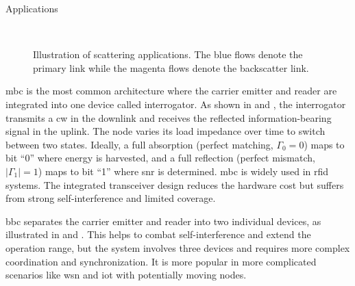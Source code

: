 \begin{section}{}
	\begin{subsection}{Applications}
		\begin{figure}[!t]
			\centering
			\\
			\caption{
				Illustration of scattering applications.
				The blue flows denote the primary link while the magenta flows denote the backscatter link.
			}
		\end{figure}

		\begin{subsubsection}{}
			\gls{mbc} is the most common architecture where the carrier emitter and reader are integrated into one device called interrogator.
			As shown in  and , the interrogator transmits a \gls{cw} in the downlink and receives the reflected information-bearing signal in the uplink.
			The node varies its load impedance over time to switch between two states.
			Ideally, a full absorption (perfect matching, $\Gamma_0 = 0$) maps to bit ``0'' where energy is harvested, and a full reflection (perfect mismatch, $\lvert \Gamma_1 \rvert = 1$) maps to bit ``1'' where \gls{snr} is determined.
			\gls{mbc} is widely used in \gls{rfid} systems.
			The integrated transceiver design reduces the hardware cost but suffers from strong self-interference and limited coverage.
		\end{subsubsection}

		\begin{subsubsection}{}
			\gls{bbc} separates the carrier emitter and reader into two individual devices, as illustrated in  and .
			This helps to combat self-interference and extend the operation range, but the system involves three devices and requires more complex coordination and synchronization.
			It is more popular in more complicated scenarios like \gls{wsn} and \gls{iot} with potentially moving nodes.
		\end{subsubsection}


\end{subsection}
\end{section}
